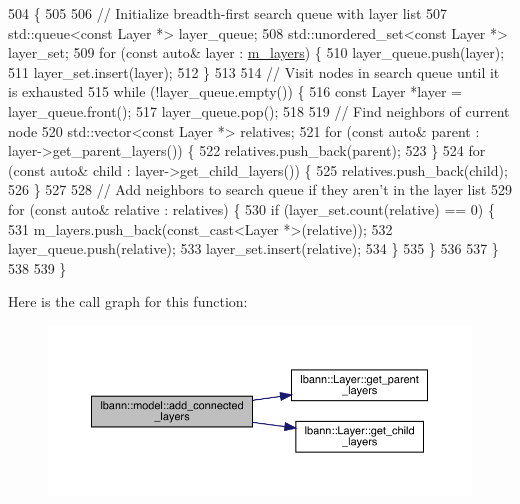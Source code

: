 \begin{DoxyCode}
504                                  \{
505 
506   \textcolor{comment}{// Initialize breadth-first search queue with layer list}
507   std::queue<const Layer *> layer\_queue;
508   std::unordered\_set<const Layer *> layer\_set;
509   \textcolor{keywordflow}{for} (\textcolor{keyword}{const} \textcolor{keyword}{auto}& layer : \hyperlink{classlbann_1_1model_a0229fc226ec163d1411548446104569d}{m\_layers}) \{
510     layer\_queue.push(layer);
511     layer\_set.insert(layer);
512   \}
513 
514   \textcolor{comment}{// Visit nodes in search queue until it is exhausted}
515   \textcolor{keywordflow}{while} (!layer\_queue.empty()) \{
516     \textcolor{keyword}{const} Layer *layer = layer\_queue.front();
517     layer\_queue.pop();
518 
519     \textcolor{comment}{// Find neighbors of current node}
520     std::vector<const Layer *> relatives;
521     \textcolor{keywordflow}{for} (\textcolor{keyword}{const} \textcolor{keyword}{auto}& parent : layer->get\_parent\_layers()) \{
522       relatives.push\_back(parent);
523     \}
524     \textcolor{keywordflow}{for} (\textcolor{keyword}{const} \textcolor{keyword}{auto}& child : layer->get\_child\_layers()) \{
525       relatives.push\_back(child);
526     \}
527 
528     \textcolor{comment}{// Add neighbors to search queue if they aren't in the layer list}
529     \textcolor{keywordflow}{for} (\textcolor{keyword}{const} \textcolor{keyword}{auto}& relative : relatives) \{
530       \textcolor{keywordflow}{if} (layer\_set.count(relative) == 0) \{
531         m\_layers.push\_back(const\_cast<Layer *>(relative));
532         layer\_queue.push(relative);
533         layer\_set.insert(relative);
534       \}
535     \}
536 
537   \}
538   
539 \}
\end{DoxyCode}
Here is the call graph for this function\+:\nopagebreak
\begin{figure}[H]
\begin{center}
\leavevmode
\includegraphics[width=350pt]{classlbann_1_1model_a3fb0304e6426dd28a436f50559ef2bef_cgraph}
\end{center}
\end{figure}
